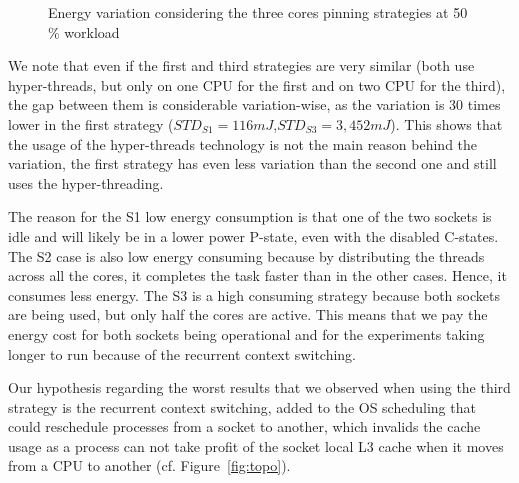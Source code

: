 \begin{figure}
    \caption{Energy variation considering the three cores pinning strategies at 50\,\% workload}\label{fig:cores-pinning}
\end{figure}

We note that even if the first and third strategies are very similar (both use hyper-threads, but only on one CPU for the first and on two CPU for the third), the gap between them is considerable variation-wise, as the variation is 30 times lower in the first strategy ($STD_{S1}=116 mJ$,$STD_{S3}=3,452 mJ$).
This shows that the usage of the hyper-threads technology is not the main reason behind the variation, the first strategy has even less variation than the second one and still uses the hyper-threading.

The reason for the \textsf{S1} low energy consumption is that one of the two sockets is idle and will likely be in a lower power P-state, even with the disabled C-states.
The \textsf{S2} case is also low energy consuming because by distributing the threads across all the cores, it completes the task faster than in the other cases.
Hence, it consumes less energy.
The \textsf{S3} is a high consuming strategy because both sockets are being used, but only half the cores are active.
This means that we pay the energy cost for both sockets being operational and for the experiments taking longer to run because of the recurrent context switching.

Our hypothesis regarding the worst results that we observed when using the third strategy is the recurrent context switching, added to the OS scheduling that could reschedule processes from a socket to another, which invalids the cache usage as a process can not take profit of the socket local L3 cache when it moves from a CPU to another (cf. Figure~\ref{fig:topo}).

